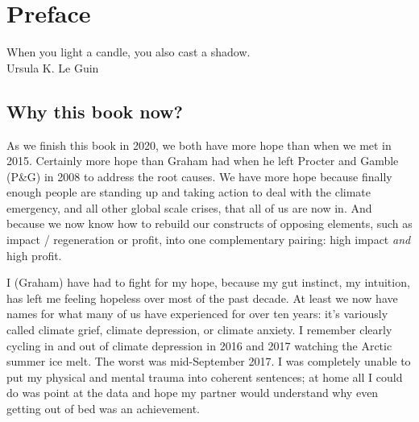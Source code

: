 ﻿%


\chapter{Preface}
\label{chapter:preface}




\begin{chapterquotation}
When you light a candle, you also cast a shadow.\\
\raggedleft\textemdash Ursula K. Le Guin
\end{chapterquotation}






\section*{Why this book now?}
As we finish this book in 2020, we both have more hope than when we met in 2015. Certainly more hope than Graham had when he left Procter and Gamble (P\&G) in 2008 to address the root causes. We have more hope because finally enough people are standing up and taking action to deal with the climate emergency, and all other global scale crises, that all of us are now in\cite{ten-signs-climate}. And because we now know how to rebuild our constructs of opposing elements, such as impact / regeneration or profit, into one complementary pairing: high impact \emph{and} high profit.


\begin{longstoryblock}
I (Graham) have had to fight for my hope, because my gut instinct, my intuition, has left me feeling hopeless over most of the past decade. At least we now have names for what many of us have experienced for over ten years: it’s variously called climate grief, climate depression, or climate anxiety. I remember clearly cycling in and out of climate depression in 2016 and 2017 watching the Arctic  summer ice melt. The worst was mid-September 2017. I was completely unable to put my physical and mental trauma into coherent sentences; at home all I could do was point at the data and hope my partner would understand why even getting out of bed was an achievement. 
\end{longstoryblock}


